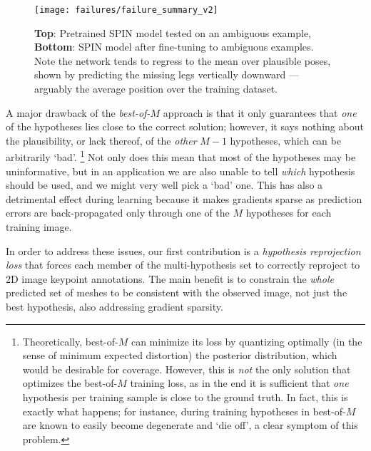 \begin{wrapfigure}{r}{0.4\textwidth}
  \vspace{-0.3cm}
  \begin{center}
    \texttt{[image: failures/failure\_summary\_v2]} %
  \end{center}
    \vspace{-0.3cm}
    \caption{\textbf{Top}: Pretrained SPIN model tested on an ambiguous example, \textbf{Bottom}: SPIN model after fine-tuning to ambiguous examples. Note the network tends to regress to the mean over plausible poses, shown by predicting the missing legs vertically downward --- arguably the average position over the training dataset.}\label{fig:issues}
\end{wrapfigure}


A major drawback of the \emph{best-of-$M$} approach is that it only guarantees that \emph{one} of the hypotheses lies close to the correct solution; however, it says nothing about the plausibility, or lack thereof, of the \emph{other} $M-1$ hypotheses, which can be arbitrarily `bad'.%
%
\footnote{
Theoretically, best-of-$M$ can minimize its loss by quantizing optimally (in the sense of minimum expected distortion) the posterior distribution, which would be desirable for coverage.
However, this is \emph{not} the only solution that optimizes the best-of-$M$ training loss, as in the end it is sufficient that \emph{one} hypothesis per training sample is close to the ground truth.
In fact, this is exactly what happens; for instance, during training hypotheses in best-of-$M$ are known to easily become degenerate and `die off', a clear symptom of this problem.
}
%
Not only does this mean that most of the hypotheses may be uninformative, but in an application we are also unable to tell \emph{which} hypothesis should be used, and we might very well pick a `bad'
one.
This has also a detrimental effect during learning because it  makes gradients sparse as prediction errors are back-propagated only through one of the $M$ hypotheses for each training image.

In order to address these issues, our first contribution is a \emph{hypothesis reprojection loss} that forces each member of the multi-hypothesis set to correctly reproject to 2D image keypoint annotations.
The main benefit is to constrain the \emph{whole} predicted set of meshes to be consistent with the observed image, not just the best hypothesis, also addressing gradient sparsity.

